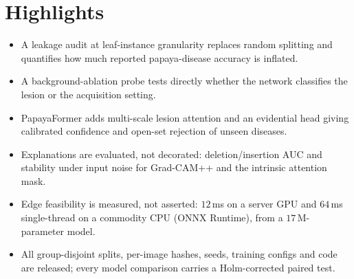 \documentclass[10pt,twocolumn,a4paper]{article}
\begin{document}
\section*{Highlights}
\vspace{-3pt}
\begin{itemize}[leftmargin=1.1em,itemsep=1pt,topsep=2pt]
\item A leakage audit at leaf-instance granularity replaces random splitting and quantifies how much reported papaya-disease accuracy is inflated.
\item A background-ablation probe tests directly whether the network classifies the lesion or the acquisition setting.
\item PapayaFormer adds multi-scale lesion attention and an evidential head giving calibrated confidence and open-set rejection of unseen diseases.
\item Explanations are evaluated, not decorated: deletion/insertion AUC and stability under input noise for Grad-CAM++ and the intrinsic attention mask.
\item Edge feasibility is measured, not asserted: $12$\,ms on a server GPU and $64$\,ms single-thread on a commodity CPU (ONNX Runtime), from a $17$\,M-parameter model.
\item All group-disjoint splits, per-image hashes, seeds, training configs and code are released; every model comparison carries a Holm-corrected paired test.
\end{itemize}

\end{document}
